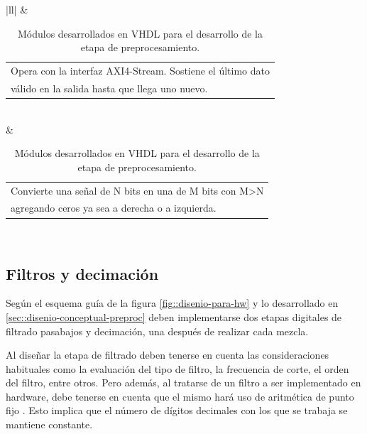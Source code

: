 \documentclass[../../main.tex]{subfiles}
\begin{document}
\begin{table}[H]
{\begin{tabular}{|ll|}
           & \begin{tabular}[c]{@{}l@{}}Opera con la interfaz AXI4-Stream. Sostiene el último dato\\ válido en la salida hasta que llega uno nuevo.\end{tabular}                                                                                                                                                                      \\ \hline
                                                           & \begin{tabular}[c]{@{}l@{}}Convierte una señal de N bits en una de M bits con M\textgreater{}N\\ agregando ceros ya sea a derecha o a izquierda.\end{tabular}                                                                                                                                                            \\ \hline
    \end{tabular}%
    }
    \caption{Módulos desarrollados en VHDL para el desarrollo de la etapa de preprocesamiento.}
    \label{tab::ip-fran}
    \end{table}

\subsection{Filtros y decimación}\label{subsec::filtros-decimacion}
Según el esquema guía de la figura \ref{fig::disenio-para-hw} y lo desarrollado en \ref{sec::disenio-conceptual-preproc} deben implementarse dos etapas digitales de filtrado pasabajos y decimación, una después de realizar cada mezcla. 

Al diseñar la etapa de filtrado deben tenerse en cuenta las consideraciones habituales  como la evaluación del tipo de filtro, la frecuencia de corte, el orden del filtro, entre otros. Pero además, al tratarse de un filtro a ser implementado en hardware, debe tenerse en cuenta que el mismo hará uso de aritmética de punto fijo \cite{pto-fijo}. Esto implica que el número de dígitos decimales con los que se trabaja se mantiene constante.
\end{document}
